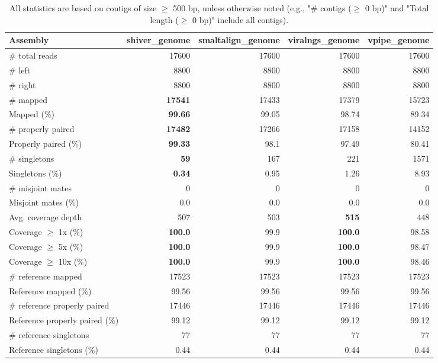 \documentclass[12pt,a4paper]{article}
\begin{document}
\begin{table}[ht]
\begin{center}
\caption{All statistics are based on contigs of size $\geq$ 500 bp, unless otherwise noted (e.g., "\# contigs ($\geq$ 0 bp)" and "Total length ($\geq$ 0 bp)" include all contigs).}
\begin{tabular}{|l*{4}{|r}|}
\hline
Assembly & shiver\_genome & smaltalign\_genome & viralngs\_genome & vpipe\_genome \\ \hline
\# total reads & 17600 & 17600 & 17600 & 17600 \\ \hline
\# left & 8800 & 8800 & 8800 & 8800 \\ \hline
\# right & 8800 & 8800 & 8800 & 8800 \\ \hline
\# mapped & {\bf 17541} & 17433 & 17379 & 15723 \\ \hline
Mapped (\%) & {\bf 99.66} & 99.05 & 98.74 & 89.34 \\ \hline
\# properly paired & {\bf 17482} & 17266 & 17158 & 14152 \\ \hline
Properly paired (\%) & {\bf 99.33} & 98.1 & 97.49 & 80.41 \\ \hline
\# singletons & {\bf 59} & 167 & 221 & 1571 \\ \hline
Singletons (\%) & {\bf 0.34} & 0.95 & 1.26 & 8.93 \\ \hline
\# misjoint mates & 0 & 0 & 0 & 0 \\ \hline
Misjoint mates (\%) & 0.0 & 0.0 & 0.0 & 0.0 \\ \hline
Avg. coverage depth & 507 & 503 & {\bf 515} & 448 \\ \hline
Coverage $\geq$ 1x (\%) & {\bf 100.0} & 99.9 & {\bf 100.0} & 98.58 \\ \hline
Coverage $\geq$ 5x (\%) & {\bf 100.0} & 99.9 & {\bf 100.0} & 98.47 \\ \hline
Coverage $\geq$ 10x (\%) & {\bf 100.0} & 99.9 & {\bf 100.0} & 98.46 \\ \hline
\# reference mapped & 17523 & 17523 & 17523 & 17523 \\ \hline
Reference mapped (\%) & 99.56 & 99.56 & 99.56 & 99.56 \\ \hline
\# reference properly paired & 17446 & 17446 & 17446 & 17446 \\ \hline
Reference properly paired (\%) & 99.12 & 99.12 & 99.12 & 99.12 \\ \hline
\# reference singletons & 77 & 77 & 77 & 77 \\ \hline
Reference singletons (\%) & 0.44 & 0.44 & 0.44 & 0.44 \\ \hline

\end{tabular}
\end{center}
\end{table}
\end{document}
